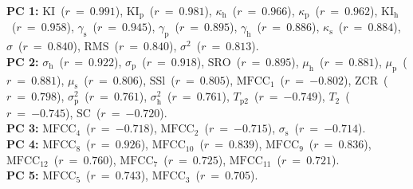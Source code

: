 {\bf{PC 1:}} $\textrm{KI}$~($r~=~{0.991}$), $\textrm{KI}_{\textrm{p}}$~($r~=~{0.981}$), $\kappa_{\textrm{h}}$~($r~=~{0.966}$), $\kappa_{\textrm{p}}$~($r~=~{0.962}$), $\textrm{KI}_{\textrm{h}}$~($r~=~{0.958}$), $\gamma_{\textrm{s}}$~($r~=~{0.945}$), $\gamma_{\textrm{p}}$~($r~=~{0.895}$), $\gamma_{\textrm{h}}$~($r~=~{0.886}$), $\kappa_{\textrm{s}}$~($r~=~{0.884}$), $\sigma$~($r~=~{0.840}$), $\textrm{RMS}$~($r~=~{0.840}$), $\sigma^{2}$~($r~=~{0.813}$).\vspace{0.5em}\\
{\bf{PC 2:}} $\sigma_{\textrm{h}}$~($r~=~{ 0.922}$), $\sigma_{\textrm{p}}$~($r~=~{ 0.918}$), $\textrm{SRO}$~($r~=~{ 0.895}$), $\mu_{\textrm{h}}$~($r~=~{ 0.881}$), $\mu_{\textrm{p}}$~($r~=~{ 0.881}$), $\mu_{\textrm{s}}$~($r~=~{ 0.806}$), $\textrm{SSl}$~($r~=~{ 0.805}$), $\textrm{MFCC}_{1}$~($r~=~{-0.802}$), $\textrm{ZCR}$~($r~=~{ 0.798}$), $\sigma_{\textrm{p}}^{2}$~($r~=~{ 0.761}$), $\sigma_{\textrm{h}}^{2}$~($r~=~{ 0.761}$), $T_{\textrm{p}2}$~($r~=~{-0.749}$), $T_{2}$~($r~=~{-0.745}$), $\textrm{SC}$~($r~=~{-0.720}$).\vspace{0.5em}\\
{\bf{PC 3:}} $\textrm{MFCC}_{4}$~($r~=~{-0.718}$), $\textrm{MFCC}_{2}$~($r~=~{-0.715}$), $\sigma_{\textrm{s}}$~($r~=~{-0.714}$).\vspace{0.5em}\\
{\bf{PC 4:}} $\textrm{MFCC}_{8}$~($r~=~{0.926}$), $\textrm{MFCC}_{10}$~($r~=~{0.839}$), $\textrm{MFCC}_{9}$~($r~=~{0.836}$), $\textrm{MFCC}_{12}$~($r~=~{0.760}$), $\textrm{MFCC}_{7}$~($r~=~{0.725}$), $\textrm{MFCC}_{11}$~($r~=~{0.721}$).\vspace{0.5em}\\
{\bf{PC 5:}} $\textrm{MFCC}_{5}$~($r~=~{0.743}$), $\textrm{MFCC}_{3}$~($r~=~{0.705}$).
